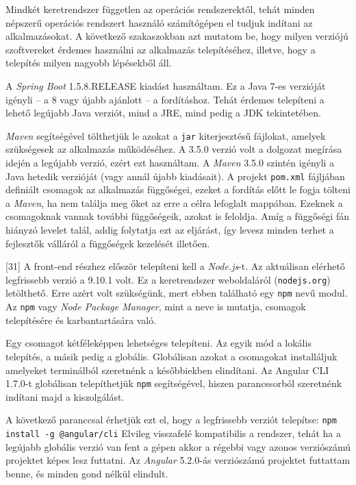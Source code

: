 

Mindkét keretrendszer független az operációs rendszerektől, tehát minden népszerű operációs rendszert használó számítógépen el tudjuk indítani az alkalmazásokat. A következő szakaszokban azt mutatom be, hogy milyen verziójú szoftvereket érdemes használni az alkalmazás telepítéséhez, illetve, hogy a telepítés milyen nagyobb lépésekből áll.


A \textit{Spring Boot} 1.5.8.RELEASE kiadást használtam. Ez a Java 7-es verzióját igényli -- a 8 vagy újabb ajánlott -- a fordításhoz. Tehát érdemes telepíteni a lehető legújabb Java verziót, mind a JRE, mind pedig a JDK tekintetében.

\textit{Maven} segítségével tölthetjük le azokat a \texttt{jar} kiterjesztésű fájlokat, amelyek szükségesek az alkalmazás működéséhez. A 3.5.0 verzió volt a dolgozat megírása idején a legújabb verzió, ezért ezt használtam. A \textit{Maven} 3.5.0 szintén igényli a Java hetedik verzióját (vagy annál újabb kiadásait). A projekt \texttt{pom.xml} fájljában definiált csomagok az alkalmazás függőségei, ezeket a fordítás előtt le fogja tölteni a \textit{Maven}, ha nem találja meg őket az erre a célra lefoglalt mappában. Ezeknek a csomagoknak vannak további függőségeik, azokat is feloldja. Amíg a függőségi fán hiányzó levelet talál, addig folytatja ezt az eljárást, így levesz minden terhet a fejlesztők válláról a függőségek kezelését illetően.


[31] A front-end részhez először telepíteni kell a \textit{Node.js}-t. Az aktuálisan elérhető legfrissebb verzió a 9.10.1 volt. Ez a keretrendszer weboldaláról (\texttt{nodejs.org}) letölthető. Erre azért volt szükségünk, mert ebben található egy \texttt{npm} nevű modul. Az \texttt{npm} vagy \textit{Node Package Manager}, mint a neve is mutatja, csomagok telepítésére és karbantartására való.

Egy csomagot kétféleképpen lehetséges telepíteni. Az egyik mód a lokális telepítés, a másik pedig a globális. Globálisan azokat a csomagokat installáljuk amelyeket terminálból szeretnénk a későbbiekben elindítani.
Az Angular CLI 1.7.0-t globálisan telepíthetjük \texttt{npm} segítségével, hiszen parancssorból szeretnénk indítani majd a kiszolgálást.

A következő paranccsal érhetjük ezt el, hogy a legfrissebb verziót telepítse: \texttt{npm install -g @angular/cli}
Elvileg visszafelé kompatibilis a rendszer, tehát ha a legújabb globális verzió van fent a gépen akkor a régebbi vagy azonos verziószámú projektet képes lesz futtatni. Az \textit{Angular} 5.2.0-ás verziószámú projektet futtattam benne, és minden gond nélkül elindult.

